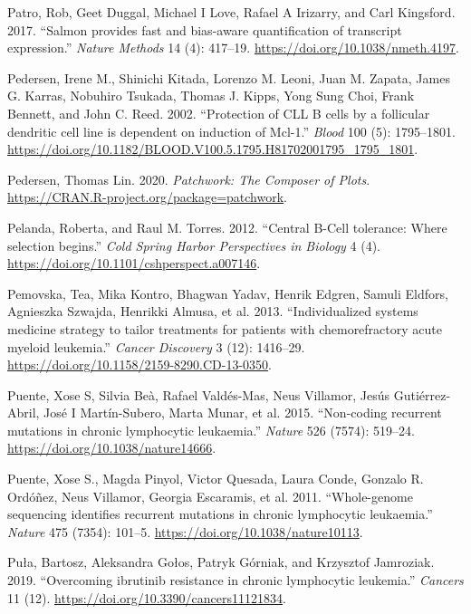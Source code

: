 \documentclass[11pt, a4paper, twosided]{book}
\newenvironment{CSLReferences}%
  {}%
  {\par}
\begin{document}
\begin{CSLReferences}{1}{0}
\leavevmode{}%
Patro, Rob, Geet Duggal, Michael I Love, Rafael A Irizarry, and Carl Kingsford. 2017. {``{Salmon provides fast and bias-aware quantification of transcript expression}.''} \emph{Nature Methods} 14 (4): 417--19. \url{https://doi.org/10.1038/nmeth.4197}.

\leavevmode{}%
Pedersen, Irene M., Shinichi Kitada, Lorenzo M. Leoni, Juan M. Zapata, James G. Karras, Nobuhiro Tsukada, Thomas J. Kipps, Yong Sung Choi, Frank Bennett, and John C. Reed. 2002. {``{Protection of CLL B cells by a follicular dendritic cell line is dependent on induction of Mcl-1}.''} \emph{Blood} 100 (5): 1795--1801. \url{https://doi.org/10.1182/BLOOD.V100.5.1795.H81702001795_1795_1801}.

\leavevmode{}%
Pedersen, Thomas Lin. 2020. \emph{Patchwork: The Composer of Plots}. \url{https://CRAN.R-project.org/package=patchwork}.

\leavevmode{}%
Pelanda, Roberta, and Raul M. Torres. 2012. {``{Central B-Cell tolerance: Where selection begins}.''} \emph{Cold Spring Harbor Perspectives in Biology} 4 (4). \url{https://doi.org/10.1101/cshperspect.a007146}.

\leavevmode{}%
Pemovska, Tea, Mika Kontro, Bhagwan Yadav, Henrik Edgren, Samuli Eldfors, Agnieszka Szwajda, Henrikki Almusa, et al. 2013. {``{Individualized systems medicine strategy to tailor treatments for patients with chemorefractory acute myeloid leukemia}.''} \emph{Cancer Discovery} 3 (12): 1416--29. \url{https://doi.org/10.1158/2159-8290.CD-13-0350}.

\leavevmode{}%
Puente, Xose S, Silvia Beà, Rafael Valdés-Mas, Neus Villamor, Jesús Gutiérrez-Abril, José I Martín-Subero, Marta Munar, et al. 2015. {``{Non-coding recurrent mutations in chronic lymphocytic leukaemia.}''} \emph{Nature} 526 (7574): 519--24. \url{https://doi.org/10.1038/nature14666}.

\leavevmode{}%
Puente, Xose S., Magda Pinyol, Victor Quesada, Laura Conde, Gonzalo R. Ordóñez, Neus Villamor, Georgia Escaramis, et al. 2011. {``{Whole-genome sequencing identifies recurrent mutations in chronic lymphocytic leukaemia}.''} \emph{Nature} 475 (7354): 101--5. \url{https://doi.org/10.1038/nature10113}.

\leavevmode{}%
Puła, Bartosz, Aleksandra Gołos, Patryk Górniak, and Krzysztof Jamroziak. 2019. {``{Overcoming ibrutinib resistance in chronic lymphocytic leukemia}.''} \emph{Cancers} 11 (12). \url{https://doi.org/10.3390/cancers11121834}.


\end{CSLReferences}
\end{document}
